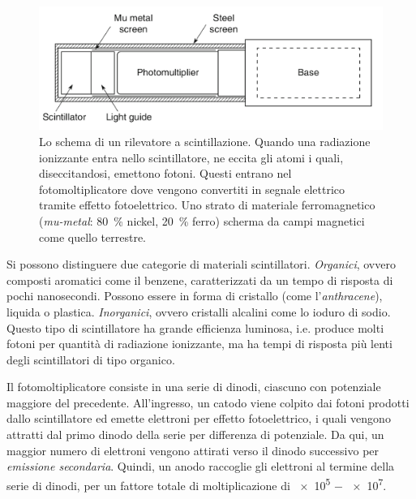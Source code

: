 \documentclass[../main.tex]{subfiles}
\begin{document}
\begin{figure}[b!]
    \centering
    \includegraphics[width=\textwidth]{pmt_trasp.png}
    \caption{Lo schema di un rilevatore a scintillazione. Quando una radiazione ionizzante entra nello scintillatore, ne eccita gli atomi i quali, diseccitandosi, emettono fotoni. Questi entrano nel fotomoltiplicatore dove vengono convertiti in segnale elettrico tramite effetto fotoelettrico. Uno strato di materiale ferromagnetico (\emph{mu-metal}: \SI{80}{\%} nickel, \SI{20}{\%} ferro) scherma da campi magnetici come quello terrestre.
    \cite{spurio}}
    \label{fig:pmt}
\end{figure}

Si possono distinguere due categorie di materiali scintillatori.
\emph{Organici}, ovvero composti aromatici come il benzene, caratterizzati da un tempo di risposta di pochi nanosecondi. Possono essere in forma di cristallo (come l'\emph{anthracene}), liquida o plastica. \emph{Inorganici}, ovvero cristalli alcalini come lo ioduro di sodio. Questo tipo di scintillatore ha grande efficienza luminosa, i.e. produce molti fotoni per quantità di radiazione ionizzante, ma ha tempi di risposta più lenti degli scintillatori di tipo organico.

Il fotomoltiplicatore consiste in una serie di dinodi, ciascuno con potenziale maggiore del precedente. All'ingresso, un catodo viene colpito dai fotoni prodotti dallo scintillatore ed emette elettroni per effetto fotoelettrico, i quali vengono attratti dal primo dinodo della serie per differenza di potenziale. Da qui, un maggior numero di elettroni vengono attirati verso il dinodo successivo per \emph{emissione secondaria}. Quindi, un anodo raccoglie gli elettroni al termine della serie di dinodi, per un fattore totale di moltiplicazione di \SI{e5}{} $-$ \SI{e7}{}.
\end{document}
